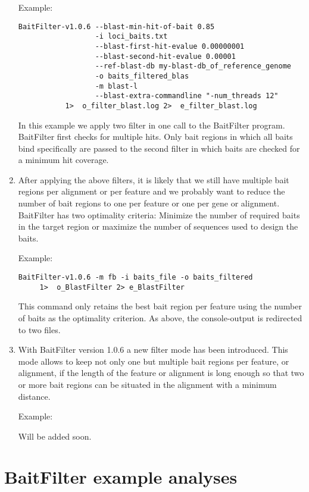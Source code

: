 \documentclass[a4paper,pdflatex,11pt]{article}
\begin{document}
\begin{enumerate}
Example:

\begin{verbatim}
BaitFilter-v1.0.6 --blast-min-hit-of-bait 0.85
                  -i loci_baits.txt
                  --blast-first-hit-evalue 0.00000001
                  --blast-second-hit-evalue 0.00001
                  --ref-blast-db my-blast-db_of_reference_genome
                  -o baits_filtered_blas
                  -m blast-l
                  --blast-extra-commandline "-num_threads 12"
           1>  o_filter_blast.log 2>  e_filter_blast.log
\end{verbatim}

In this example we apply two filter in one call to the BaitFilter program.
BaitFilter first checks for multiple hits. Only bait regions in which all baits bind specifically
are passed to the second filter in which baits
are checked for a minimum hit coverage.

\item
  After applying the above filters, it is likely that we still have multiple bait regions
  per alignment or per feature and we probably want to reduce the number of bait regions to
  one per feature or one per gene or alignment.
  BaitFilter has two optimality criteria: Minimize the number of required baits in the
  target region or maximize the number of sequences used to design the baits.

Example:
\begin{verbatim}
BaitFilter-v1.0.6 -m fb -i baits_file -o baits_filtered
     1>  o_BlastFilter 2> e_BlastFilter
\end{verbatim}

This command only retains the best bait region per feature using the
number of baits as the optimality criterion. As above, the
console-output is redirected to two files.

\item With BaitFilter version 1.0.6 a new filter mode has been introduced.
This mode allows to keep not only one but multiple bait regions per feature, or alignment, if the
length of the feature or alignment is long enough so that two or more bait regions can be situated
in the alignment with a minimum distance.

Example:

Will be added soon.

\end{enumerate}

\section{BaitFilter example analyses}
\end{document}
